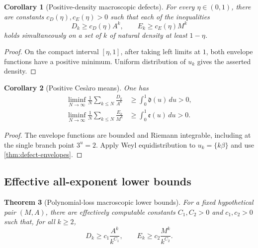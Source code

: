 \documentclass[11pt]{article}
\newtheorem{theorem}{Theorem}[section]
\newtheorem{corollary}[theorem]{Corollary}
\theoremstyle{definition}
\begin{document}
\begin{corollary}[Positive-density macroscopic defects]\label{cor:density-macro}
For every \(\eta\in(0,1)\), there are constants
\(c_D(\eta),c_E(\eta)>0\) such that each of the inequalities
\begin{equation}\label{eq:density-macro}
 D_k\ge c_D(\eta)A^k,
 \qquad
 E_k\ge c_E(\eta)M^k
\end{equation}
holds simultaneously on a set of \(k\) of natural density at least
\(1-\eta\).
\end{corollary}

\begin{proof}
On the compact interval \([\eta,1]\), after taking left limits at \(1\),
both envelope functions have a positive minimum.  Uniform distribution of
\(u_k\) gives the asserted density.
\end{proof}

\begin{corollary}[Positive Ces\`aro means]\label{cor:Cesaro}
One has
\begin{align}
 \liminf_{N\to\infty}\frac1N\sum_{k\le N}\frac{D_k}{A^k}
 &\ge\int_0^1\mathfrak d(u)\,du>0,
 \label{eq:Cesaro-D}\\
 \liminf_{N\to\infty}\frac1N\sum_{k\le N}\frac{E_k}{M^k}
 &\ge\int_0^1\mathfrak e(u)\,du>0.
 \label{eq:Cesaro-E}
\end{align}
\end{corollary}

\begin{proof}
The envelope functions are bounded and Riemann integrable, including at the
single branch point \(3^u=2\).  Apply Weyl equidistribution to
\(u_k=\{k\beta\}\) and use \cref{thm:defect-envelopes}.
\end{proof}

\subsection{Effective all-exponent lower bounds}

\begin{theorem}[Polynomial-loss macroscopic lower bounds]\label{thm:all-k-macro}
For a fixed hypothetical pair \((M,A)\), there are effectively computable
constants \(C_1,C_2>0\) and \(c_1,c_2>0\) such that, for all \(k\ge2\),
\begin{equation}\label{eq:all-k-macro}
 D_k\ge c_1\frac{A^k}{k^{C_1}},
 \qquad
 E_k\ge c_2\frac{M^k}{k^{C_2}}.
\end{equation}
\end{theorem}
\end{document}
